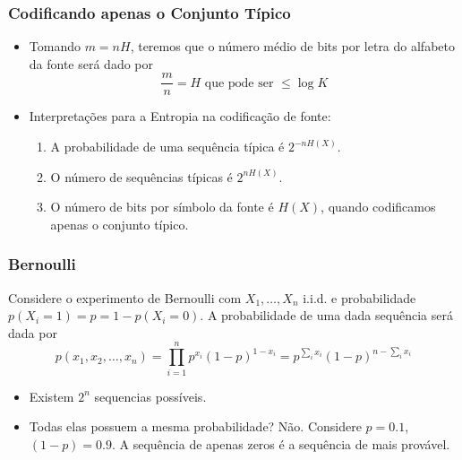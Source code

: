 \begin{frame}%
  \frametitle{Codificando apenas o Conjunto Típico}
  \begin{itemize}
  \item Tomando $m=nH$, teremos que o número médio de bits por letra do alfabeto da fonte será dado por
        \begin{equation}
        \frac{m}{n} = H         \text{  que pode ser } \leq \log K
        \end{equation}
  \item Interpretações para a Entropia na codificação de fonte:
        \begin{enumerate}
        \item A probabilidade de uma sequência típica é $2^{-nH(X)}$.
        \item O número de sequências típicas é $2^{nH(X)}$.
        \item O número de bits por símbolo da fonte é $H(X)$, quando codificamos apenas o conjunto típico.
        \end{enumerate}
  \end{itemize}
\end{frame}


\begin{frame}%
  \frametitle{Bernoulli}
  Considere o experimento de Bernoulli com $X_1,\ldots,X_n$ i.i.d. e probabilidade
  $p(X_i=1)=p=1-p(X_i=0)$. A probabilidade de uma dada sequência será dada por
  \begin{equation}
  p(x_1,x_2,\ldots,x_n) = \prod_{i=1}^n p^{x_i} (1-p)^{1-x_i} = p^{\sum_i x_i} (1-p)^{n - \sum_i x_i}
  \end{equation}

  \begin{itemize}
  \item Existem $2^n$ sequencias possíveis.
  \item Todas elas possuem a mesma probabilidade? Não. Considere $p=0.1$, $(1-p)=0.9$.
        A sequência de apenas zeros é a sequência de mais provável.
  \end{itemize}
\end{frame}

